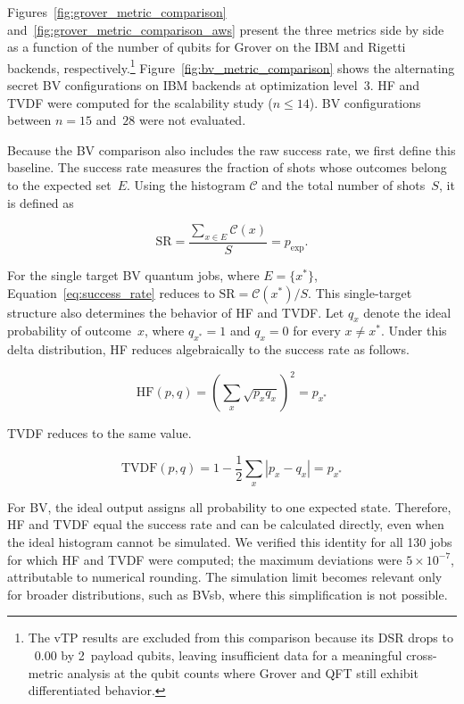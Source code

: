 \documentclass[pdflatex,sn-mathphys-num]{sn-jnl}
\theoremstyle{thmstyleone}%
\theoremstyle{thmstyletwo}%
\theoremstyle{thmstylethree}%
\begin{document}
Figures~\ref{fig:grover_metric_comparison} and~\ref{fig:grover_metric_comparison_aws} present the three metrics side by side as a function of the number of qubits for Grover on the IBM and Rigetti backends, respectively.\footnote{The vTP results are excluded from this comparison because its DSR drops to ~$0.00$ by 2~payload qubits, leaving insufficient data for a meaningful cross-metric analysis at the qubit counts where Grover and QFT still exhibit differentiated behavior.} Figure~\ref{fig:bv_metric_comparison} shows the alternating secret BV configurations on IBM backends at optimization level~3. HF and TVDF were computed for the scalability study ($n\leq 14$). BV configurations between $n=15$ and~$28$ were not evaluated.

Because the BV comparison also includes the raw success rate, we first define this baseline. The success rate measures the fraction of shots whose outcomes belong to the expected set~$E$. Using the histogram $\mathcal{C}$ and the total number of shots~$S$, it is defined as

\begin{equation}
\label{eq:success_rate}
\mathrm{SR}
=
\frac{\sum_{x\in E}\mathcal{C}(x)}{S}
=
p_{\mathrm{exp}}.
\end{equation}

For the single target BV quantum jobs, where $E=\{x^\ast\}$, Equation~\eqref{eq:success_rate} reduces to $\mathrm{SR}=\mathcal{C}(x^\ast)/S$. This single-target structure also determines the behavior of HF and TVDF. Let $q_x$ denote the ideal probability of outcome~$x$, where $q_{x^\ast}=1$ and $q_x=0$ for every $x\neq x^\ast$. Under this delta distribution, HF reduces algebraically to the success rate as follows.

\begin{equation}
\label{eq:hf_bv}
\mathrm{HF}(p,q)
=
\left(\sum_x \sqrt{p_x q_x}\right)^2
=
p_{x^\ast}
\end{equation}

TVDF reduces to the same value.

\begin{equation}
\label{eq:tvdf_bv}
\mathrm{TVDF}(p,q)
=
1-\frac{1}{2}\sum_x |p_x-q_x|
=
p_{x^\ast}
\end{equation}

For BV, the ideal output assigns all probability to one expected state. Therefore, HF and TVDF equal the success rate and can be calculated directly, even when the ideal histogram cannot be simulated. We verified this identity for all 130 jobs for which HF and TVDF were computed; the maximum deviations were $5\times10^{-7}$, attributable to numerical rounding. The simulation limit becomes relevant only for broader distributions, such as BVsb, where this simplification is not possible.
\end{document}
